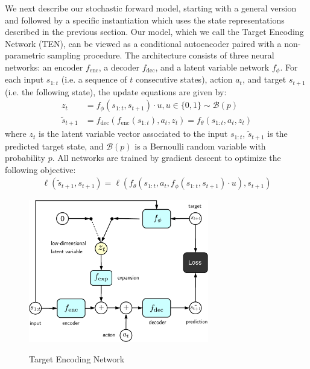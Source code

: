 \documentclass{article} %
\begin{document}
We next describe our stochastic forward model, starting with a general version and followed by a specific instantiation which uses the state representations described in the previous section.
Our model, which we call the Target Encoding Network (TEN), can be viewed as a conditional autoencoder paired with a non-parametric sampling procedure.
The architecture consists of three neural networks: an encoder $f_\text{enc}$, a decoder $f_\text{dec}$, and a latent variable network $f_\phi$.
For each input $s_{1:t}$ (i.e. a sequence of $t$ consecutive states), action $a_t$, and  target $s_{t+1}$ (i.e. the following state), the update equations are given by:
%
\begin{align}
  \label{eq:update-eqn}
  z_t &= f_\phi(s_{1:t}, s_{t+1}) \cdot u, u \in \{0, 1\} \sim \mathcal{B}(p) \\
  \tilde{s}_{t+1} &= f_\text{dec}(f_\text{enc}(s_{1:t}), a_t, z_t) = f_\theta(s_{1:t}, a_t, z_t)
\end{align}
%
where $z_t$ is the latent variable vector associated to the input $s_{1:t}$, $\tilde{s}_{t + 1}$ is the predicted target state, and $\mathcal{B}(p)$ is a Bernoulli random variable with probability $p$.
All networks are trained by gradient descent to optimize the following objective:
%
\begin{align}
  \ell(\tilde{s}_{t+1}, s_{t+1}) = \ell(f_\theta(s_{1:t}, a_t, f_\phi(s_{1:t}, s_{t+1}) \cdot u), s_{t+1})
  \label{ten-loss}
\end{align}


\begin{figure}[t!]
    \centering
    \includegraphics[width=0.7\textwidth]{figures/driving/ten_train-crop.pdf} \\
    \label{ten}
    \caption{Target Encoding Network}
\end{figure}
\end{document}
